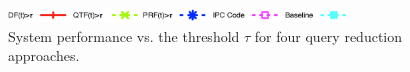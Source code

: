 \begin{figure}[t!]
\begin{centering}
\includegraphics[width=9cm]{imgs/legend2}
\par\end{centering}

\begin{centering}
\par\end{centering}

\protect\caption{System performance vs. the threshold $\tau$ for four query reduction approaches.}
\label{fig:queryreduc}
\end{figure}

